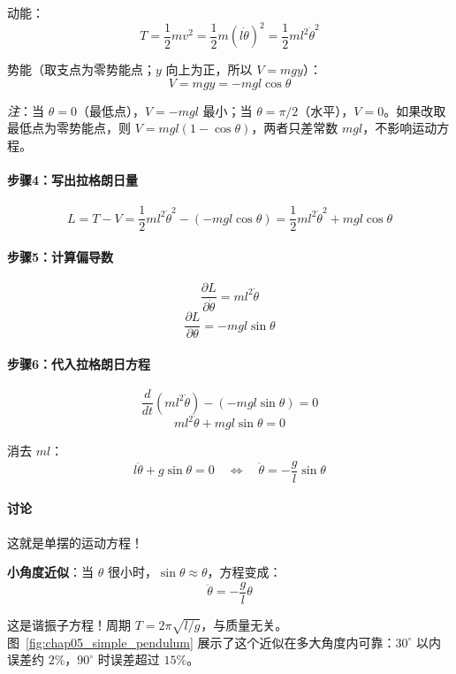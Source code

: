 动能：
\[
T = \frac{1}{2}mv^2 = \frac{1}{2}m(l\dot{\theta})^2 = \frac{1}{2}ml^2\dot{\theta}^2
\]

势能（取支点为零势能点；$y$ 向上为正，所以 $V = mgy$）：
\[
V = mgy = -mgl\cos\theta
\]

\textit{注}：当 $\theta = 0$（最低点），$V = -mgl$ 最小；当 $\theta = \pi/2$（水平），$V = 0$。如果改取最低点为零势能点，则 $V = mgl(1 - \cos\theta)$，两者只差常数 $mgl$，不影响运动方程。

\paragraph{步骤4：写出拉格朗日量}

\[
L = T - V = \frac{1}{2}ml^2\dot{\theta}^2 - (-mgl\cos\theta) = \frac{1}{2}ml^2\dot{\theta}^2 + mgl\cos\theta
\]

\paragraph{步骤5：计算偏导数}

\[
\frac{\partial L}{\partial \dot{\theta}} = ml^2\dot{\theta}
\]
\[
\frac{\partial L}{\partial \theta} = -mgl\sin\theta
\]

\paragraph{步骤6：代入拉格朗日方程}

\[
\frac{d}{dt}(ml^2\dot{\theta}) - (-mgl\sin\theta) = 0
\]
\[
ml^2\ddot{\theta} + mgl\sin\theta = 0
\]

消去 $ml$：
\[
\boxed{l\ddot{\theta} + g\sin\theta = 0 \quad \Leftrightarrow \quad \ddot{\theta} = -\frac{g}{l}\sin\theta}
\]

\paragraph{讨论}

这就是单摆的运动方程！

\textbf{小角度近似}：当 $\theta$ 很小时，$\sin\theta \approx \theta$，方程变成：
\[
\ddot{\theta} = -\frac{g}{l}\theta
\]

这是谐振子方程！周期 $T = 2\pi\sqrt{l/g}$，与质量无关。图~\ref{fig:chap05_simple_pendulum} 展示了这个近似在多大角度内可靠：$30^\circ$ 以内误差约 $2\%$，$90^\circ$ 时误差超过 $15\%$。

